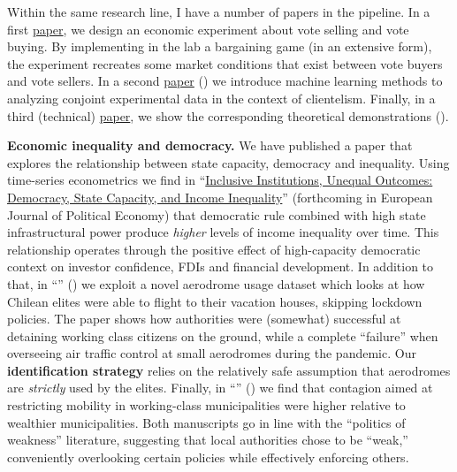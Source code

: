 Within the same research line, I have a number of papers in the pipeline. In a first \href{https://github.com/hbahamonde/Economic_Experiment_Vote_Selling/raw/master/abstract.txt}{paper}, we design an economic experiment about vote selling and vote buying. By implementing in the lab a bargaining game (in an extensive form), the experiment recreates some market conditions that exist between vote buyers and vote sellers. In a second \href{https://github.com/hbahamonde/Conjoint_US/raw/master/Bahamonde_Quininao_Conjoint.pdf}{paper} ({\unskip}) we introduce machine learning methods to analyzing conjoint experimental data in the context of clientelism. Finally, in a third (technical) \href{https://github.com/hbahamonde/Conjoint_US/raw/master/Bahamonde_Quininao_Conjoint_Letter_PA.pdf}{paper}, we show the corresponding theoretical demonstrations ({\unskip}).


{\bf Economic inequality and democracy.} We have published a paper that explores the relationship between state capacity, democracy and inequality. Using time-series econometrics we find in ``\href{https://doi.org/10.1016/j.ejpoleco.2021.102048}{Inclusive Institutions, Unequal Outcomes: Democracy, State Capacity, and Income Inequality}'' (forthcoming in European Journal of Political Economy) that democratic rule combined with high state infrastructural power produce \emph{higher} levels of income inequality over time. This relationship operates through the positive effect of high-capacity democratic context on investor confidence, FDIs and financial development. In addition to that, in ``\href{https://raw.githubusercontent.com/hbahamonde/Tobalaba/master/abstract.txt}{{\unskip}}'' (\emph{\unskip}) we exploit a novel aerodrome usage dataset which looks at how Chilean elites were able to flight to their vacation houses, skipping lockdown policies. The paper shows how authorities were (somewhat) successful at detaining working class citizens on the ground, while a complete ``failure'' when overseeing air traffic control at small aerodromes during the pandemic. Our {\bf identification strategy} relies on the relatively safe assumption that aerodromes are \emph{strictly} used by the elites. Finally, in ``\href{https://github.com/hbahamonde/Bus/raw/main/abstract.txt}{{\unskip}}'' (\emph{\unskip}) we find that contagion aimed at restricting mobility in working-class municipalities were higher relative to wealthier municipalities. Both manuscripts go in line with the ``politics of weakness'' literature, suggesting that local authorities chose to be ``weak,'' conveniently overlooking certain policies while effectively enforcing others.

